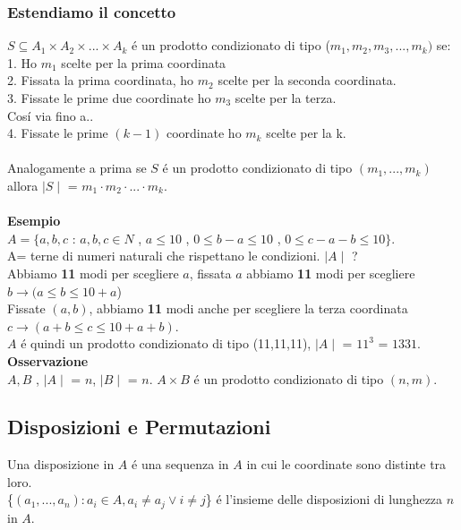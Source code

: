 \documentclass[11pt]{article}
\begin{document}
            \subsubsection{Estendiamo il concetto}
            $S \subseteq A_1 \times A_2 \times ... \times A_k$ \'e un prodotto condizionato di tipo ($m_1,m_2,m_3,...,m_k)$ se:\\
            1. Ho $m_1$ scelte per la prima coordinata\\
            2. Fissata la prima coordinata, ho $m_2$ scelte per la seconda coordinata.\\
            3. Fissate le prime due coordinate ho $m_3$ scelte per la terza.\\
            Cos\'i via fino a..\\
            4. Fissate le prime $(k-1)$ coordinate ho $m_k$ scelte per la k.\\
            \\
            Analogamente a prima se $S$ \'e un prodotto condizionato di tipo $(m_1,...,m_k)$ allora $\mid S \mid $ = $m_1 \cdot m_2 \cdot ... \cdot m_k$.\\
            \\
            \textbf{Esempio}\\
            $A=\{a,b,c$ : $a,b,c \in N$ , $a \leq 10$ , $0\leq b-a \leq 10$ , $0 \leq c-a-b \leq 10 \}$.\\ A= terne di numeri naturali che rispettano le condizioni. $\mid A \mid $ ?
            \\Abbiamo \textbf{11} modi per scegliere $a$, fissata $a$ abbiamo \textbf{11} modi per scegliere $b\rightarrow(a \leq b \leq 10+a$)\\
            Fissate $(a,b)$, abbiamo \textbf{11} modi anche per scegliere la terza coordinata $c\rightarrow(a+b\leq c \leq 10+a+b)$.\\
            $A$ \'e quindi un prodotto condizionato di tipo (11,11,11), $\mid A \mid$ = $11^3$ = $1331$.\\
            \textbf{Osservazione}\\
            $A,B$ , $\mid A \mid $ = $n$, $\mid B \mid$ = $n$. $A \times B $ \'e un prodotto condizionato di tipo $(n,m)$.
            \subsection{Disposizioni e Permutazioni}
            Una disposizione in $A$ \'e una sequenza in $A$ in cui le coordinate sono distinte tra loro.\\
            \{$(a_1,...,a_n):a_i \in A, a_i \neq a_j \vee i \neq j$\} \'e l'insieme delle disposizioni di lunghezza $n$ in $A$.
\end{document}
